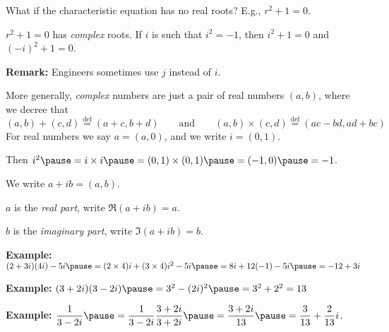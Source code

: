 \documentclass[10pt,aspectratio=169]{beamer}
\begin{document}
\begin{frame}
What if the characteristic equation has no real roots?
E.g., $r^2+1=0$.

\medskip
\pause

$r^2+1=0$ has \emph{complex} roots.  If $i$ is such that
$i^2=-1$, then $i^2+1=0$ and $(-i)^2+1 = 0$.

\pause
\medskip

\textbf{Remark:} Engineers sometimes use $j$ instead of $i$.

\medskip
\pause

More generally, \emph{complex} numbers are just a pair of real numbers
$(a,b)$, where we decree that
\[
(a,b)+(c,d)\overset{\text{def}}{=}(a+c,b+d) \qquad  \text{and} \qquad
(a,b) \times (c,d) \overset{\text{def}}{=} (ac-bd,ad+bc)
\]
\pause
For real numbers we say $a = (a,0)$, and we write $i=(0,1)$.

\medskip
\pause

Then $i^2 \pause = i \times i \pause = (0,1) \times (0,1) \pause = (-1,0)
\pause = -1$.

\medskip
\pause

We write $a+ib = (a,b)$.

\pause
$a$ is the \emph{real part}, write $\Re (a+ib) = a$.

\pause
$b$ is the \emph{imaginary part}, write $\Im (a+ib) = b$.

\medskip
\pause

\textbf{Example:}
\quad
$(2+3i)(4i) - 5i
\pause
=
(2\times 4)i + (3 \times 4) i^2 - 5i
\pause
=
8i + 12 (-1) - 5i
\pause
=
-12 + 3i$

\medskip
\pause

\textbf{Example:}
\quad
$(3+2i)(3-2i)
\pause
= 3^2-(2i)^2
\pause
= 3^2+2^2
=13$

\medskip
\pause

\textbf{Example:}
\quad
$\displaystyle \frac{1}{3-2i}
\pause
= \frac{1}{3-2i} \frac{3+2i}{3+2i}
\pause
= \frac{3+2i}{13}
\pause
= \frac{3}{13}+\frac{2}{13}i$.
\end{frame}
\end{document}
